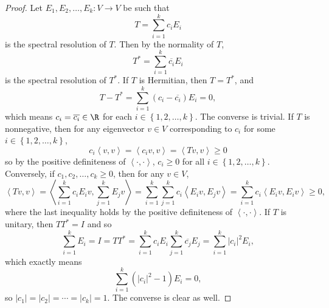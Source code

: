 \documentclass[linearalgebra]{subfiles}
\begin{document}
    \begin{proof}
        Let $E_1,E_2,\ldots,E_k:V\to V$ be such that
        \begin{equation*}
            T = \sum^{k}_{i=1} c_iE_i
        \end{equation*}
        is the spectral resolution of $T$. Then by the normality of $T$,
        \begin{equation*}
            T^* = \sum^{k}_{i=1} \overline{c_i} E_i
        \end{equation*}
        is the spectral resolution of $T^*$. If $T$ is Hermitian, then $T = T^*$, and
        \begin{equation*}
            T - T^* = \sum^{k}_{i=1} \left( c_i - \overline{c_i}  \right) E_i = 0,
        \end{equation*}
        which means $c_i = \overline{c_i} \in\R$ for each $i\in\left\lbrace 1,2,\ldots,k \right\rbrace$. The converse is trivial. If $T$ is nonnegative, then for any eigenvector $v\in V$ corresponding to $c_i$ for some $i\in\left\lbrace 1,2,\ldots,k \right\rbrace$,
        \begin{equation*}
            c_i\left\langle v, v\right\rangle = \left\langle c_iv, v\right\rangle = \left\langle Tv, v\right\rangle \geq 0
        \end{equation*}
        so by the positive definiteness of $\left\langle \cdot, \cdot\right\rangle$, $c_i\geq 0$ for all $i\in\left\lbrace 1,2,\ldots,k \right\rbrace $. Conversely, if $c_1,c_2,\ldots,c_k\geq 0$, then for any $v\in V$,
        \begin{equation*}
            \left\langle Tv, v\right\rangle = \left\langle \sum^{k}_{i=1} c_iE_iv, \sum^{k}_{j=1} E_jv\right\rangle = \sum^{k}_{i=1} \sum^{k}_{j=1} c_i\left\langle E_iv, E_jv\right\rangle = \sum^{k}_{i=1} c_i \left\langle E_iv, E_iv\right\rangle \geq 0,
        \end{equation*}
        where the last inequality holds by the positive definiteness of $\left\langle \cdot, \cdot\right\rangle$. If $T$ is unitary, then $TT^* = I$ and so
        \begin{equation*}
            \sum^{k}_{i=1} E_i = I = TT^* = \sum^{k}_{i=1} c_iE_i\sum^{k}_{j=1} \overline{c_j} E_j = \sum^{k}_{i=1} \left| c_i \right| ^2E_i,
        \end{equation*}
        which exactly means
        \begin{equation*}
            \sum^{k}_{i=1} \left( \left| c_i \right| ^2-1 \right) E_i = 0,
        \end{equation*}
        so $\left| c_1 \right| = \left| c_2 \right| = \cdots = \left| c_k \right| = 1$. The converse is clear as well.
    \end{proof}
\end{document}
